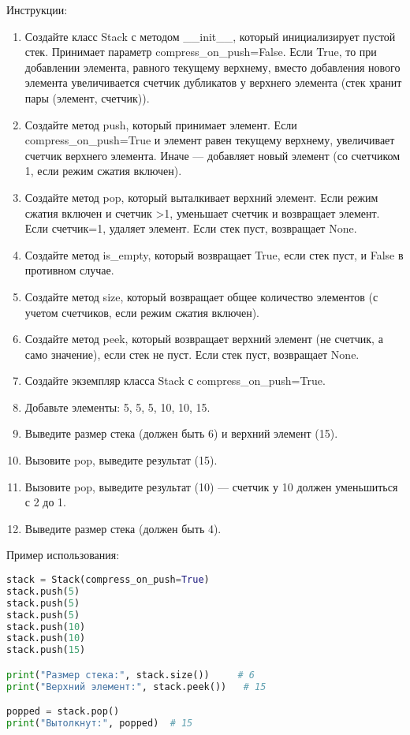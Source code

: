 \begin{enumerate}
Инструкции:
\begin{enumerate}
    \item Создайте класс Stack с методом \_\_init\_\_, который инициализирует пустой стек. Принимает параметр compress\_on\_push=False. Если True, то при добавлении элемента, равного текущему верхнему, вместо добавления нового элемента увеличивается счетчик дубликатов у верхнего элемента (стек хранит пары (элемент, счетчик)).
    \item Создайте метод push, который принимает элемент. Если compress\_on\_push=True и элемент равен текущему верхнему, увеличивает счетчик верхнего элемента. Иначе — добавляет новый элемент (со счетчиком 1, если режим сжатия включен).
    \item Создайте метод pop, который выталкивает верхний элемент. Если режим сжатия включен и счетчик >1, уменьшает счетчик и возвращает элемент. Если счетчик=1, удаляет элемент. Если стек пуст, возвращает None.
    \item Создайте метод is\_empty, который возвращает True, если стек пуст, и False в противном случае.
    \item Создайте метод size, который возвращает общее количество элементов (с учетом счетчиков, если режим сжатия включен).
    \item Создайте метод peek, который возвращает верхний элемент (не счетчик, а само значение), если стек не пуст. Если стек пуст, возвращает None.
    \item Создайте экземпляр класса Stack с compress\_on\_push=True.
    \item Добавьте элементы: 5, 5, 5, 10, 10, 15.
    \item Выведите размер стека (должен быть 6) и верхний элемент (15).
    \item Вызовите pop, выведите результат (15).
    \item Вызовите pop, выведите результат (10) — счетчик у 10 должен уменьшиться с 2 до 1.
    \item Выведите размер стека (должен быть 4).
\end{enumerate}

Пример использования:
\begin{lstlisting}[language=Python]
stack = Stack(compress_on_push=True)
stack.push(5)
stack.push(5)
stack.push(5)
stack.push(10)
stack.push(10)
stack.push(15)

print("Размер стека:", stack.size())     # 6
print("Верхний элемент:", stack.peek())   # 15

popped = stack.pop()
print("Вытолкнут:", popped)  # 15


\end{lstlisting}
\end{enumerate}
